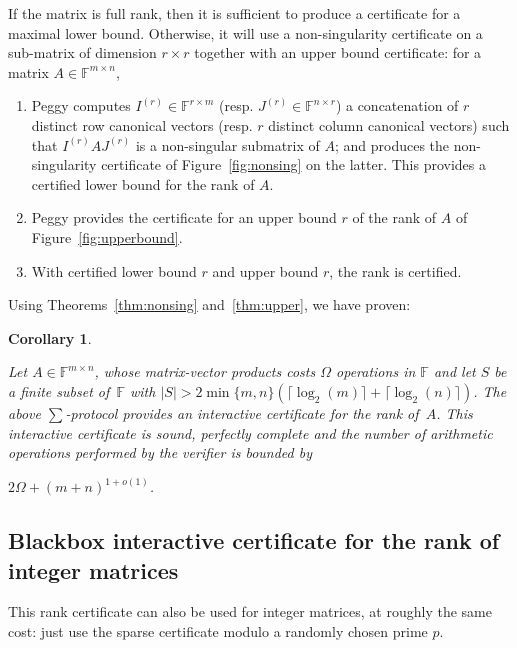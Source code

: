 \documentclass{article}
\newcommand{\customlinebreak}{}
\newtheorem{corollary}{Corollary}
\newcommand{\F}{\ensuremath{\mathbb F}}
\newcommand{\card}[1]{\ensuremath{\left|#1\right|}\xspace}
\begin{document}
If the matrix is full rank, then it is sufficient to produce a certificate for
a maximal lower bound.
Otherwise, it will use a non-singularity certificate on a sub-matrix of
dimension $r\times r$ together with an upper
bound certificate: 
for a matrix $A\in\F^{m\times n}$,
\begin{enumerate}
\item 
   
  Peggy computes $I^{(r)}\in\F^{r\times m}$
  (resp. $J^{(r)}\in\F^{n\times r}$) a concatenation of $r$ distinct
    row canonical vectors (resp. $r$ distinct column canonical
    vectors) such that $I^{(r)} A J^{(r)}$ is a non-singular
    submatrix of $A$;
    and produces the non-singularity certificate of
  Figure~\ref{fig:nonsing} on the latter. This
  provides a certified lower bound for the rank of $A$.
\item Peggy provides the certificate for an upper bound $r$ of the rank of $A$
  of Figure~\ref{fig:upperbound}. 
\item With certified lower bound $r$ and upper bound $r$, the rank
  is certified.
\end{enumerate}
Using Theorems~\ref{thm:nonsing} and~\ref{thm:upper}, we have proven:
\begin{corollary}\label{cor:sparserank}
 
  Let $A\in\F^{m\times n}$, whose matrix-vector products 
  costs $\Omega$ operations in $\F$ and let $S$ be a finite subset of~$\F$ with 
  $\card{S}> 2\min\{m,n\}(\lceil\log_2(m)\rceil+\lceil\log_2(n)\rceil)$.  
  The above $\sum$-protocol provides an interactive certificate for the rank
  of~$A$.
  This interactive certificate is sound, perfectly complete and the number of
  arithmetic operations performed by the verifier is bounded by
   
  $2\Omega+(m+n)^{1+o(1)}$.
\end{corollary}


 
\subsection{Blackbox interactive certificate for the{\customlinebreak} rank of integer matrices}
This rank certificate can also be used for integer matrices, at roughly the same
cost: just use the sparse certificate modulo a randomly chosen prime $p$.
\end{document}
